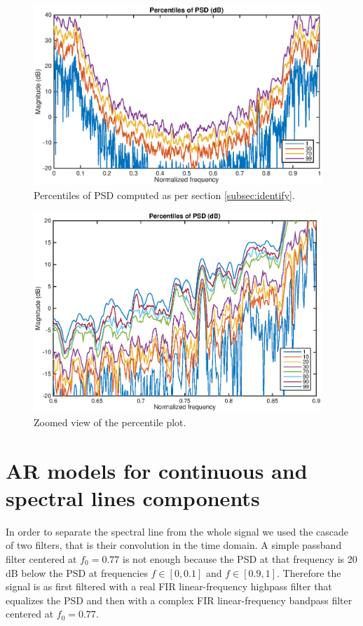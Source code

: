 \documentclass[10pt]{article}
\numberwithin{equation}{section}
\begin{document}
\begin{figure}[h!]
  \centering
  \includegraphics[width = 0.97\textwidth]{images/percentiles}
  \caption{Percentiles of PSD computed as per section \ref{subsec:identify}.}
  \label{fig:percentiles}
\end{figure}

\begin{figure}[h!]
  \centering
  \includegraphics[width = 0.97\textwidth]{images/percentiles_zoom}
  \caption{Zoomed view of the percentile plot.}
  \label{fig:percentiles_zoom}
\end{figure}

\section{AR models for continuous and spectral lines components}
In order to separate the spectral line from the whole signal we used the cascade of two filters, that is their convolution in the time domain. A simple passband filter centered at $f_0 = 0.77$ is not enough because the PSD at that frequency is 20 dB below the PSD at frequencies $f \in [0, 0.1]$ and $f \in [0.9, 1]$. Therefore the signal is as first filtered with a real FIR linear-frequency highpass filter that equalizes the PSD and then with a complex FIR linear-frequency bandpass filter centered at $f_0 = 0.77$.
\end{document}
